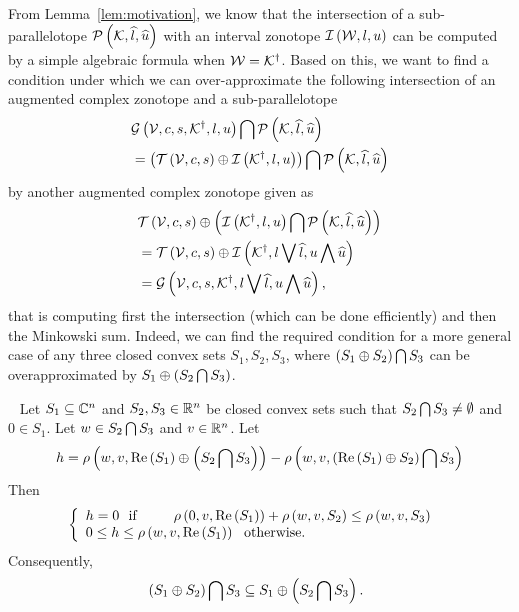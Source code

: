 From
Lemma~\ref{lem:motivation}, we know that the intersection of a
sub-parallelotope $\mathcal{P}\left(\mathcal{K},\widehat{l},\widehat{u}\right)$ with an interval
zonotope $\mathit{\operatorname{\mathcal{I}}}\left(\mathcal{W},l,u\right)$ can be computed by a simple
algebraic formula when
$\mathcal{W}={\mathcal{K}}^\dagger$.  Based on this, we want to find a condition
under which we can over-approximate the following intersection of an
augmented complex zonotope and a sub-parallelotope
%
\begin{align*}
& \mathcal{G}\left(\mathcal{V},c,s,{\mathcal{K}}^\dagger,l,u\right)\bigcap \mathcal{P}\left(\mathcal{K},\widehat{l},\widehat{u}\right)\\
& =\left(\mathit{\operatorname{\mathcal{T}}}\left(\mathcal{V},c,s\right)\oplus \mathit{\operatorname{\mathcal{I}}}\left({\mathcal{K}}^\dagger,l,u\right)\right)\bigcap \mathcal{P}\left(\mathcal{K},\widehat{l},\widehat{u}\right)
\end{align*}
%
by another augmented complex zonotope given as
%
\begin{align*}
& \mathit{\operatorname{\mathcal{T}}}\left(\mathcal{V},c,s\right)\oplus \left(\mathit{\operatorname{\mathcal{I}}}\left({\mathcal{K}}^\dagger,l,u\right)\bigcap \mathcal{P}\left(\mathcal{K},\widehat{l},\widehat{u}\right)\right)\\
& =
  \mathit{\operatorname{\mathcal{T}}}\left(\mathcal{V},c,s\right)\oplus \mathit{\operatorname{\mathcal{I}}}\left({\mathcal{K}}^\dagger,l\bigvee \widehat{l},u\bigwedge \widehat{u}\right)\\
& = \mathcal{G}\left(\mathcal{V},c,s,{\mathcal{K}}^\dagger,l\bigvee \widehat{l},u\bigwedge \widehat{u}\right),
\end{align*}
%
that is computing first the intersection (which can be done
efficiently) and then the Minkowski sum.  Indeed, we can find the
required condition for a more general case of any three closed convex
sets $S_1,S_2,S_3$, where $\left(S_1\oplus S_2\right)\bigcap S_3$ can be
overapproximated by $S_1\oplus\left(S_2\bigcap S_3\right)$. 
%
\begin{lemma}~\label{gen-int}
Let $S_1\subseteq \mathbb{C}^n$ and $S_2,S_3\in\mathbb{R}^n$ be closed
convex sets such that $S_2\bigcap S_3\neq \emptyset$ and $0\in S_1$.  Let
$w\in S_2\bigcap S_3$ and $v\in\mathbb{R}^n$.  Let 
%
\[
h = \rho\left(w,v,\operatorname{Re}\left(S_1\right)\oplus\left(S_2\bigcap
  S_3\right)\right)-\rho\left(w,v,\left(\operatorname{Re}\left(S_1\right)\oplus S_2\right)\bigcap
  S_3\right) 
\]
%
Then
%
\begin{align}
  &  \left\{
  \begin{array}{l}
   h = 0~~\text{if}~~~~~~~~\rho\left(0,v,\operatorname{Re}\left(S_1\right)\right)+\rho\left(w,v,S_2\right)\leq
   \rho\left(w,v,S_3\right)\\
   0\leq h \leq \rho\left(w,v,\operatorname{Re}\left(S_1\right)\right)~~\text{otherwise}.
  \end{array}
  \right.\label{eqn:support-inequality}
\end{align}
%
Consequently,
%
\begin{align}~\label{eqn:minsum-intersection}
& \left(S_1\oplus S_2\right)\bigcap S_3\subseteq S_1\oplus\left(S_2\bigcap S_3\right).
\end{align}
%
\end{lemma}
